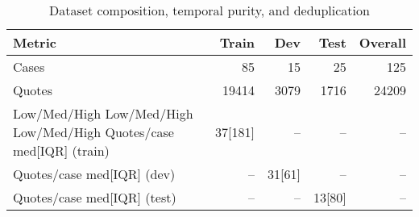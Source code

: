 \begin{table}[htbp]
\centering
\caption{Dataset composition, temporal purity, and deduplication}
\label{tab:dataset_health}
\begin{tabular}{lrrrr}
\toprule
Metric & Train & Dev & Test & Overall \\
\midrule
Cases & 85 & 15 & 25 & 125 \\
Quotes & 19414 & 3079 & 1716 & 24209 \\
Low/Med/High %
Low/Med/High %
Low/Med/High %
Quotes/case med[IQR] (train) & 37[181] & -- & -- & -- \\
Quotes/case med[IQR] (dev) & -- & 31[61] & -- & -- \\
Quotes/case med[IQR] (test) & -- & -- & 13[80] & -- \\
\bottomrule
\end{tabular}
\end{table}
